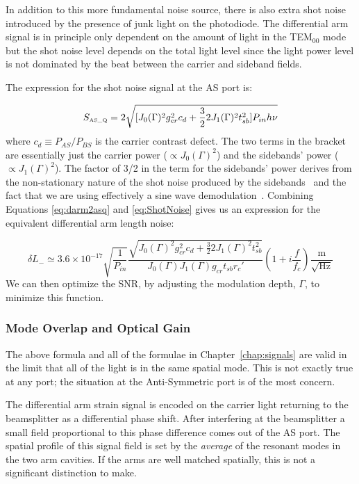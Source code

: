 In addition to this more fundamental noise source, there is also extra
shot noise introduced by the presence of junk light on the photodiode.
The differential arm signal is in principle only dependent on
the amount of light in the TEM$_{00}$ mode but the shot noise level
depends on the total light level since the light power level is not
dominated by the beat between the carrier and sideband fields.

The expression for the shot noise signal at the AS port is\cite{Sigg:FreqResp}:

\begin{equation}
S_{\mbox{\tiny AS\_Q}} =
2 \sqrt{[J_0(\Gamma)^2 g_{cr}^2 c_d 
       + \frac{3}{2} 2 J_1(\Gamma)^2 t_{sb}^2] P_{in} h \nu}
\label{eq:ShotNoise}
\end{equation}
where $c_d \equiv P_{AS}/P_{BS}$ is the carrier contrast defect. 
The two terms in the bracket are essentially 
just the carrier power 
($\propto J_0(\Gamma)^2$) and the sidebands' power ($\propto J_1(\Gamma)^2$). The
factor of 3/2 in the term for the sidebands' power derives from the non-stationary
nature of the shot noise produced by the 
sidebands~\cite{Niebauer:ShotNoise} and the fact that we are using
effectively a sine wave demodulation~\cite{Meers:modulation}.
Combining Equations \ref{eq:darm2asq} and \ref{eq:ShotNoise} gives us an 
expression for the equivalent differential arm length noise:

\begin{equation}
\delta L_- \simeq 3.6 \times 10^{-17} \sqrt{\frac{1}{P_{in}}}
            \frac{\sqrt{J_0(\Gamma)^2 g_{cr}^2 c_d 
                     + \frac{3}{2} 2 J_1(\Gamma)^2 t_{sb}^2}}
                 {J_0(\Gamma) J_1(\Gamma) g_{cr} t_{sb} r_{c}'}
             \left(1 + i \frac{f}{f_c}\right)
            \frac{\mbox{m}}{\sqrt{\mbox{Hz}}}
\end{equation}
We can then optimize the SNR, by adjusting the modulation depth, $\Gamma$,
to minimize this function.


\subsubsection{Mode Overlap and Optical Gain}

The above formula and all of the formulae in Chapter~\ref{chap:signals}
are valid in the limit that all of the light is in the same spatial
mode. This is not exactly true at any port; the situation at the
Anti-Symmetric port is of the most concern.

The differential arm strain signal is encoded on the carrier light
returning to the beamsplitter as a differential phase shift. After
interfering at the beamsplitter a small field proportional to this
phase difference comes out of the AS port. The spatial
profile of this signal field is set by the \emph{average} of the
resonant modes in the two arm cavities. If the arms
are well matched spatially, this is not a significant distinction
to make.

